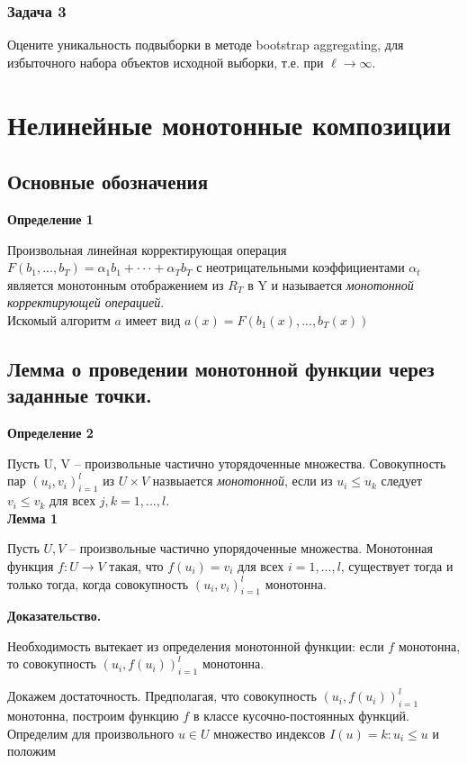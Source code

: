 \subsubsection*{Задача 3}
Оцените уникальность подвыборки в методе bootstrap aggregating, для избыточного набора объектов исходной выборки, т.е. при $\ell \to \infty$.


\section{Нелинейные монотонные композиции}
\subsection{Основные обозначения} 
 \textbf{Определение 1}
 
 Произвольная линейная корректирующая операция $F(b_1,... , b_T ) = \alpha_1 b_1 + · · · + \alpha_T b_T$ с неотрицательными коэффициентами $\alpha_t$ является монотонным отображением из $R_T$ в Y и называется \textit{монотонной корректирующей операцией}.\\
 
 Искомый алгоритм $a$ имеет вид $a(x) = F(b_1(x), . . . , b_T (x))$
 
\subsection{Лемма о проведении монотонной функции через заданные точки.}
 
 \textbf{Определение 2}
 
 Пусть U, V -- произвольные частично уторядоченные множества. Совокупность пар $(u_i, v_i)_{i=1}^l$ из $U\times V$ назвыается \textit{монотонной}, если из $u_i\leq u_k$ следует $v_i\leq v_k$ для всех $j,k = 1,...,l.$\\
 
 \textbf{Лемма 1}
 
Пусть  $U, V$ -- произвольные частично упорядоченные множества. Монотонная функция $f : U \longrightarrow V$ такая, что $f(u_i) = v_i$ для всех $i = 1, . . . , l$, существует
тогда и только тогда, когда совокупность $(u_i
, v_i)^l_{i=1}$ монотонна.

\textbf{Доказательство.}

Необходимость вытекает из определения монотонной функции: если $f$ монотонна, то совокупность $(u_i,f(u_i))^l_{i=1}$ монотонна.

Докажем достаточность. Предполагая, что совокупность $(u_i,f(u_i))^l_{i=1}$ монотонна,
построим функцию $f$ в классе кусочно-постоянных функций. Определим для произвольного $u \in U $ множество индексов $I(u) = {k : u_i \leq u}$ и положим

